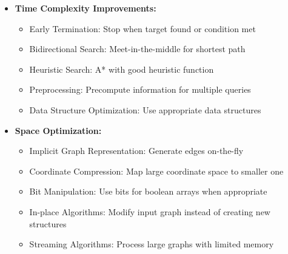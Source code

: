 \documentclass[a4paper,10pt]{book}
\begin{document}
\begin{itemize}[leftmargin=*]
    \item \textbf{Time Complexity Improvements:}
    \begin{itemize}
        \item Early Termination: Stop when target found or condition met
        \item Bidirectional Search: Meet-in-the-middle for shortest path
        \item Heuristic Search: A* with good heuristic function
        \item Preprocessing: Precompute information for multiple queries
        \item Data Structure Optimization: Use appropriate data structures
    \end{itemize}

    \item \textbf{Space Optimization:}
    \begin{itemize}
        \item Implicit Graph Representation: Generate edges on-the-fly
        \item Coordinate Compression: Map large coordinate space to smaller one
        \item Bit Manipulation: Use bits for boolean arrays when appropriate
        \item In-place Algorithms: Modify input graph instead of creating new structures
        \item Streaming Algorithms: Process large graphs with limited memory
    \end{itemize}
\end{itemize}
\end{document}
